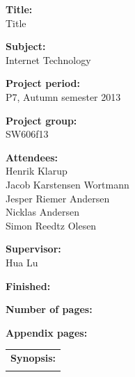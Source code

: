 \begin{titlingpage}
\begin{nopagebreak}
{\noindent\begin{minipage}[c]{0.4\textwidth}
	\begin{flushleft} 
	\begin{description}	
\item {\textbf{Title:}}\\
Title
\item {\textbf{Subject:}}\\
Internet Technology
\item {\textbf{Project period:}}\\
   P7, Autumn semester 2013\\
  \hspace{4cm}
\item {\textbf{Project group:}}\\
  SW606f13\\
  \hspace{4cm}
\item {\textbf{Attendees:}}\\
Henrik Klarup \\
Jacob Karstensen Wortmann \\
Jesper Riemer Andersen \\
Nicklas Andersen \\
Simon Reedtz Olesen \\

\item {\textbf{Supervisor:}}\\
Hua Lu \\
\end{description}

\begin{description}
\item {\textbf{Finished:}}
\item {\textbf{Number of pages:}} \pageref{lastpage}
\item {\textbf{Appendix pages:}} 
\end{description}
\vfill
	\end{flushleft}
\end{minipage}
\begin{minipage}[c]{0.6\textwidth}
	\begin{flushright} 
		  \vspace{.15cm}
  \hfill 
  \begin{tabular}{l}
  {\textbf{Synopsis:}}\bigskip \\
  \fbox{
    \parbox{5.5cm}{\bigskip
     {\vfill{\small 
     \bigskip}}
     }}
   \end{tabular}
	\end{flushright}
\end{minipage}

}
\end{nopagebreak}
\end{titlingpage}
